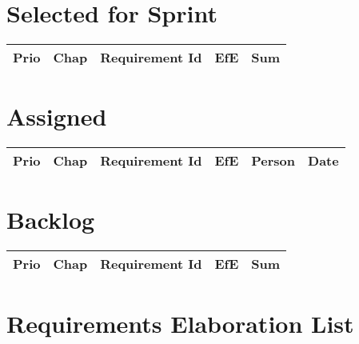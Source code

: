 \section{Selected for Sprint}
\begin{longtable}{|r|c|p{7cm}||r|r|} \hline
\textbf{Prio} & \textbf{Chap} & \textbf{Requirement Id} & \textbf{EfE} & \textbf{Sum} \\ \hline\endhead
\end{longtable}\section{Assigned}
\begin{longtable}{|r|c|p{6.5cm}||r|l|l|} \hline
\textbf{Prio} & \textbf{Chap} & \textbf{Requirement Id} & \textbf{EfE} & \textbf{Person} & \textbf{Date} \\ \hline\endhead
\end{longtable}\section{Backlog}
\begin{longtable}{|r|c|p{7cm}||r|r|} \hline
\textbf{Prio} & \textbf{Chap} & \textbf{Requirement Id} & \textbf{EfE} & \textbf{Sum} \\ \hline\endhead
\end{longtable}\section{Requirements Elaboration List}
